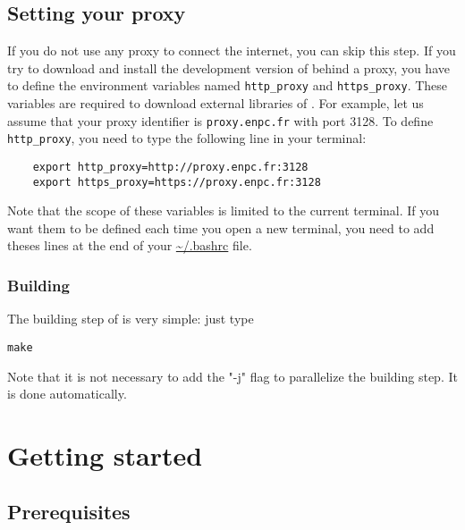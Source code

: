 \section{Setting your proxy}

If you do not use any proxy to connect the internet, you can skip this step. If you try to download and install the development version of \Simol behind a proxy, you have to define the environment variables named \texttt{http\_proxy} and \texttt{https\_proxy}. These variables are required to download external libraries of \Simol. For example, let us assume that your proxy identifier is \texttt{proxy.enpc.fr} with port 3128. To define \texttt{http\_proxy}, you need to type the following line in your terminal:

\begin{verbatim}
    export http_proxy=http://proxy.enpc.fr:3128
    export https_proxy=https://proxy.enpc.fr:3128
\end{verbatim}

Note that the scope of these variables is limited to the current terminal. If you want them to be defined each time you open a new terminal, you need to add theses lines at the end of your \url{~/.bashrc} file.

\subsection{Building}

The building step of \Simol is very simple: just type
\begin{verbatim}
make
\end{verbatim}
Note that it is not necessary to add the "-j" flag to parallelize the building step. It is done automatically. 


\chapter{Getting started}


\section{Prerequisites}

